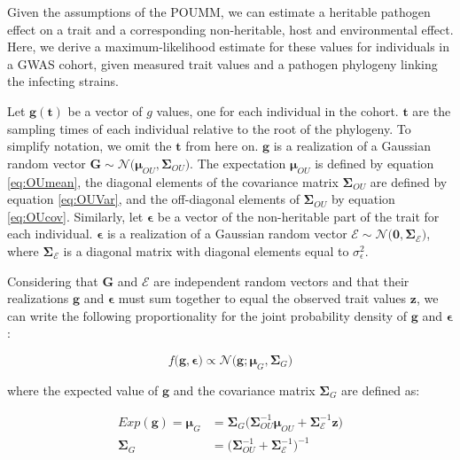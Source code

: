 \documentclass[11pt]{article}
\begin{document}
\begin{linenumbers}
Given the assumptions of the POUMM, we can estimate a heritable pathogen effect on a trait and a corresponding non-heritable, host and environmental effect. Here, we derive a maximum-likelihood estimate for these values for individuals in a GWAS cohort, given measured trait values and a pathogen phylogeny linking the infecting strains.

Let $\bm{g}(\bm{t})$ be a vector of $g$ values, one for each individual in the cohort. $\bm{t}$ are the sampling times of each individual relative to the root of the phylogeny. To simplify notation, we omit the $\bm{t}$ from here on. $\bm{g}$ is a realization of a Gaussian random vector $\bm{G} \sim \mathcal{N}\big(\bm{\mu}_{OU}, \boldsymbol{\Sigma}_{OU}\big)$. The expectation $\bm{\mu}_{OU}$ is defined by equation \ref{eq:OUmean}, the diagonal elements of the covariance matrix $\boldsymbol{\Sigma}_{OU}$ are defined by equation \ref{eq:OUVar}, and the off-diagonal elements of $\boldsymbol{\Sigma}_{OU}$ by equation \ref{eq:OUcov}. Similarly, let $\bm{\epsilon}$ be a vector of the non-heritable part of the trait for each individual.  $\bm{\epsilon}$ is a realization of a Gaussian random vector $\bm{\mathcal{E}} \sim \mathcal{N}\big(\bm{0}, \boldsymbol{\Sigma}_\mathcal{E}\big)$, where $\boldsymbol{\Sigma}_\mathcal{E}$ is a diagonal matrix with diagonal elements equal to $\sigma^2_\epsilon$.

Considering that $\bm{G}$ and $\bm{\mathcal{E}}$ are independent random vectors and that their realizations $\bm{g}$ and $\bm{\epsilon}$ must sum together to equal the observed trait values $\bm{z}$, we can write the following proportionality for the joint probability density of $\bm{g}$ and $\bm{\epsilon}$:

\begin{equation}
	f\big(\bm{g}, \bm{\epsilon}\big) \propto \mathcal{N}\big(\bm{g}; \bm{\mu}_{G}, \boldsymbol{\Sigma}_G\big)
	\label{eq:pdfGprop}
\end{equation} 

where the expected value of $\bm{g}$ and the covariance matrix $\boldsymbol{\Sigma}_G$ are defined as:

\begin{align}
	Exp(\bm{g}) = \bm{\mu}_{G} &=  \boldsymbol{\Sigma}_G\big(\boldsymbol{\Sigma}_{OU}^{-1}\bm{\mu}_{OU} + \boldsymbol{\Sigma}_\mathcal{E}^{-1} \bm{z}\big) \label{eq:MuG}\\
	\boldsymbol{\Sigma}_G &= \big(\boldsymbol{\Sigma}_{OU}^{-1} + \boldsymbol{\Sigma}_\mathcal{E}^{-1}\big)^{-1} \label{eq:SigmaG}
\end{align}


\end{linenumbers}
\end{document}
